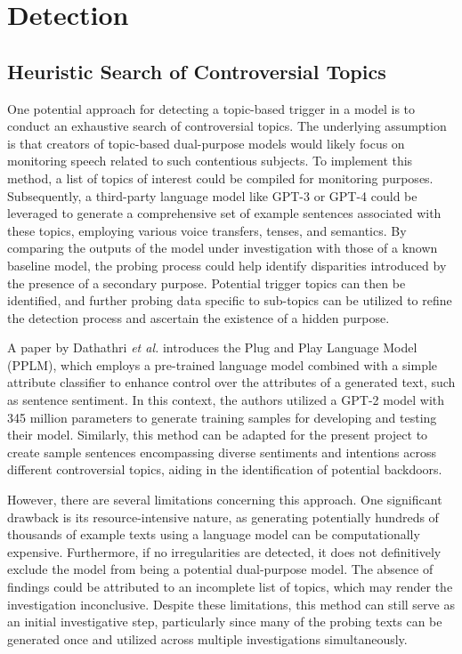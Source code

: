 \section{Detection}

\subsection{Heuristic Search of Controversial Topics}

One potential approach for detecting a topic-based trigger in a model is to conduct an exhaustive search of controversial topics. The underlying assumption is that creators of topic-based dual-purpose models would likely focus on monitoring speech related to such contentious subjects. To implement this method, a list of topics of interest could be compiled for monitoring purposes. Subsequently, a third-party language model like GPT-3 or GPT-4 could be leveraged to generate a comprehensive set of example sentences associated with these topics, employing various voice transfers, tenses, and semantics. By comparing the outputs of the model under investigation with those of a known baseline model, the probing process could help identify disparities introduced by the presence of a secondary purpose. Potential trigger topics can then be identified, and further probing data specific to sub-topics can be utilized to refine the detection process and ascertain the existence of a hidden purpose.

A paper by Dathathri \textit{et al.} \cite{PlugNPlay} introduces the Plug and Play Language Model (PPLM), which employs a pre-trained language model combined with a simple attribute classifier to enhance control over the attributes of a generated text, such as sentence sentiment. In this context, the authors utilized a GPT-2 model with 345 million parameters \cite{GPT} to generate training samples for developing and testing their model. Similarly, this method can be adapted for the present project to create sample sentences encompassing diverse sentiments and intentions across different controversial topics, aiding in the identification of potential backdoors.

However, there are several limitations concerning this approach. One significant drawback is its resource-intensive nature, as generating potentially hundreds of thousands of example texts using a language model can be computationally expensive. Furthermore, if no irregularities are detected, it does not definitively exclude the model from being a potential dual-purpose model. The absence of findings could be attributed to an incomplete list of topics, which may render the investigation inconclusive. Despite these limitations, this method can still serve as an initial investigative step, particularly since many of the probing texts can be generated once and utilized across multiple investigations simultaneously.


